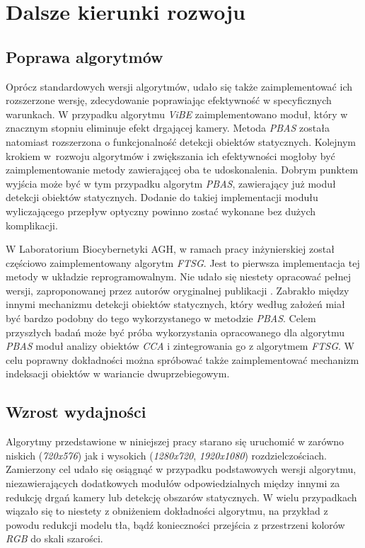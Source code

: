 \chapter{Dalsze kierunki rozwoju}
\label{cha:kierunki_rozwoju}

\section{Poprawa algorytmów}
\label{sec:poprawa_algorytmow}

Oprócz standardowych wersji algorytmów, udało się także zaimplementować ich rozszerzone wersję, zdecydowanie poprawiając efektywność w specyficznych warunkach. W przypadku algorytmu \textit{ViBE} zaimplementowano moduł, który w znacznym stopniu eliminuje efekt drgającej kamery. Metoda \textit{PBAS} została natomiast rozszerzona o funkcjonalność detekcji obiektów statycznych. Kolejnym krokiem w~rozwoju algorytmów i zwiększania ich efektywności mogłoby być zaimplementowanie metody zawierającej oba te udoskonalenia. Dobrym punktem wyjścia może być w tym przypadku algorytm \textit{PBAS}, zawierający już moduł detekcji obiektów statycznych. Dodanie do takiej implementacji modułu wyliczającego przepływ optyczny powinno zostać wykonane bez dużych komplikacji. 

W Laboratorium Biocybernetyki AGH, w ramach pracy inżynierskiej \cite{janus_15} został częściowo zaimplementowany algorytm \textit{FTSG}. Jest to pierwsza implementacja tej metody w układzie reprogramowalnym. Nie udało się niestety opracować pełnej wersji, zaproponowanej przez autorów oryginalnej publikacji \cite{wang_14}. Zabrakło między innymi mechanizmu detekcji obiektów statycznych, który według założeń miał być bardzo podobny do tego wykorzystanego w metodzie \textit{PBAS}. Celem przyszłych badań może być próba wykorzystania opracowanego dla algorytmu \textit{PBAS} moduł analizy obiektów \textit{CCA} i zintegrowania go z algorytmem \textit{FTSG}. W celu poprawny dokładności można spróbować także zaimplementować mechanizm indeksacji obiektów w wariancie dwuprzebiegowym.

\section{Wzrost wydajności}
\label{sec:wzrost_wydajnosci}

Algorytmy przedstawione w niniejszej pracy starano się uruchomić w zarówno niskich (\textit{720x576}) jak i wysokich (\textit{1280x720}, \textit{1920x1080}) rozdzielczościach. Zamierzony cel udało się osiągnąć w przypadku podstawowych wersji algorytmu, niezawierających dodatkowych modułów odpowiedzialnych między innymi za redukcję drgań kamery lub detekcję obszarów statycznych. W wielu przypadkach wiązało się to niestety z obniżeniem dokładności algorytmu, na przykład z powodu redukcji modelu tła, bądź konieczności przejścia z przestrzeni kolorów \textit{RGB} do skali szarości. 

